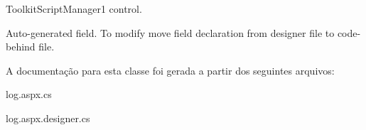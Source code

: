 ToolkitScriptManager1 control. 

Auto-\/generated field. To modify move field declaration from designer file to code-\/behind file. 

A documentação para esta classe foi gerada a partir dos seguintes arquivos:\begin{DoxyCompactItemize}
\item 
log.aspx.cs\item 
log.aspx.designer.cs\end{DoxyCompactItemize}
